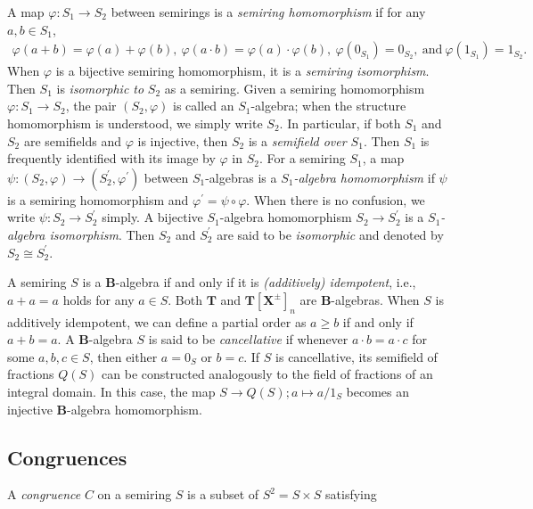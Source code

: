 \documentclass[a4paper,12pt]{amsart}
\theoremstyle{plain}
\theoremstyle{definition}
\begin{document}
A map $\varphi : S_1 \to S_2$ between semirings is a \textit{semiring homomorphism} if for any $a, b \in S_1$,
\begin{align*}
\varphi(a + b) = \varphi(a) + \varphi(b), \	\varphi(a \cdot b) = \varphi(a) \cdot \varphi(b), \	\varphi(0_{S_1}) = 0_{S_2}, \	\text{and}\	\varphi(1_{S_1}) = 1_{S_2}.
\end{align*}
When $\varphi$ is a bijective semiring homomorphism, it is a \textit{semiring isomorphism}.
Then $S_1$ is \textit{isomorphic to} $S_2$ as a semiring. 
Given a semiring homomorphism $\varphi:S_1\to S_2$, the pair $(S_2,\varphi)$ is called an $S_1$-algebra; when the structure homomorphism is understood, we simply write $S_2$.
In particular, if both $S_1$ and $S_2$ are semifields and $\varphi$ is injective, then $S_2$ is a \textit{semifield over $S_1$}.
Then $S_1$ is frequently identified with its image by $\varphi$ in $S_2$.
For a semiring $S_1$, a map $\psi : (S_2, \varphi) \to (S_2^{\prime}, \varphi^{\prime})$ between $S_1$-algebras is a \textit{$S_1$-algebra homomorphism} if $\psi$ is a semiring homomorphism and $\varphi^{\prime} = \psi \circ \varphi$.
When there is no confusion, we write $\psi : S_2 \to S_2^{\prime}$ simply.
A bijective $S_1$-algebra homomorphism $S_2 \to S_2^{\prime}$ is a \textit{$S_1$-algebra isomorphism}.
Then $S_2$ and $S_2^{\prime}$ are said to be \textit{isomorphic} and denoted by $S_2 \cong S_2^{\prime}$.

A semiring $S$ is a $\boldsymbol{B}$-algebra if and only if it is \textit{(additively) idempotent}, i.e., $a + a = a$ holds for any $a \in S$.
Both $\boldsymbol{T}$ and $\boldsymbol{T}[\boldsymbol{X}^{\pm}]_n$ are $\boldsymbol{B}$-algebras.
When $S$ is additively idempotent, we can define a partial order as $a \ge b$ if and only if $a + b = a$.
A $\boldsymbol{B}$-algebra $S$ is said to be \textit{cancellative} if whenever $a \cdot b = a \cdot c$ for some $a, b, c \in S$, then either $a = 0_S$ or $b = c$.
If $S$ is cancellative, its semifield of fractions $Q(S)$ can be constructed analogously to the field of fractions of an integral domain.
In this case, the map $S \to Q(S); a \mapsto a/1_S$ becomes an injective $\boldsymbol{B}$-algebra homomorphism.

\subsection{Congruences}
	\label{subsection2.2}

A \textit{congruence} $C$ on a semiring $S$ is a subset of $S^2 = S \times S$ satisfying
\end{document}
